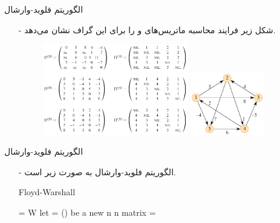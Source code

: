 \begin{frame}{‌الگوریتم فلوید-وارشال}
\begin{itemize}\itemr
\item[-]
شکل زیر فرایند محاسبه ماتریس‌های
و
را برای این گراف نشان می‌دهد.
\begin{figure}
\includegraphics[width=0.6\textwidth]{figs/chap07/658-floyd-pi-2}
\includegraphics[width=0.3\textwidth]{figs/chap07/652-graph}
\end{figure}
\end{itemize}
\end{frame}



\begin{frame}{‌الگوریتم فلوید-وارشال}
\begin{itemize}\itemr
\item[-]
الگوریتم فلوید-وارشال به صورت زیر است.
\begin{algorithm}[H]\alglr
  \caption{Floyd-Warshall} 
  \begin{algorithmic}[1]
   \State {} = W
   		\State let  = () be a new n \mc{\times} n matrix
   						\State {} = 
   				\EndFor
   		\EndFor
   	\EndFor
   	\State \Return {}                       
  \end{algorithmic}
  \label{alg:merge}
\end{algorithm}
\end{itemize}
\end{frame}


